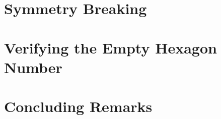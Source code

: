 \documentclass[a4paper, USenglish, cleveref, autoref, thm-restate]{lipics-v2021}
\begin{document}
% 

\section{Symmetry Breaking}\label{sec:symmetry-breaking}


\section{Verifying the Empty Hexagon Number}\label{sec:empty-hexagon-number}



\section{Concluding Remarks}\label{sec:conclusion}



\end{document}

